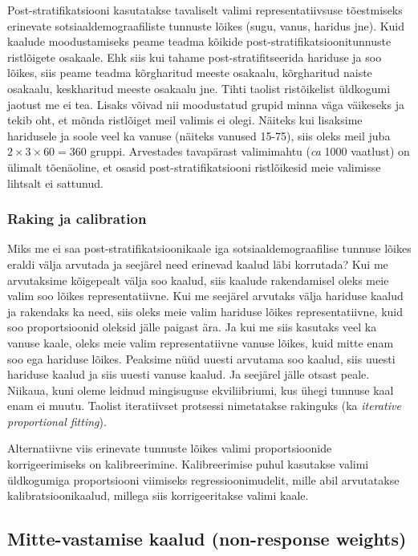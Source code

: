 \documentclass[
]{book}
\begin{document}
Post-stratifikatsiooni kasutatakse tavaliselt valimi representatiivsuse tõestmiseks erinevate sotsiaaldemograafiliste tunnuste lõikes (sugu, vanus, haridus jne). Kuid kaalude moodustamiseks peame teadma kõikide post-stratifikatsioonitunnuste ristlõigete osakaale. Ehk siis kui tahame post-stratifitseerida hariduse ja soo lõikes, siis peame teadma kõrgharitud meeste osakaalu, kõrgharitud naiste osakaalu, keskharitud meeste osakaalu jne. Tihti taolist ristõikelist üldkogumi jaotust me ei tea. Lisaks võivad nii moodustatud grupid minna väga väikeseks ja tekib oht, et mõnda ristlõiget meil valimis ei olegi. Näiteks kui lisaksime haridusele ja soole veel ka vanuse (näiteks vanused 15-75), siis oleks meil juba \(2\times3\times60 = 360\) gruppi. Arvestades tavapärast valimimahtu (\emph{ca} 1000 vaatlust) on ülimalt tõenäoline, et osasid post-stratifikatsiooni ristlõikesid meie valimisse lihtsalt ei sattunud.

\hypertarget{raking-ja-calibration}{%
\subsubsection{Raking ja calibration}\label{raking-ja-calibration}}

Miks me ei saa post-stratifikatsioonikaale iga sotsiaaldemograafilise tunnuse lõikes eraldi välja arvutada ja seejärel need erinevad kaalud läbi korrutada? Kui me arvutaksime kõigepealt välja soo kaalud, siis kaalude rakendamisel oleks meie valim soo lõikes representatiivne. Kui me seejärel arvutaks välja hariduse kaalud ja rakendaks ka need, siis oleks meie valim hariduse lõikes representatiivne, kuid soo proportsioonid oleksid jälle paigast ära. Ja kui me siis kasutaks veel ka vanuse kaale, oleks meie valim representatiivne vanuse lõikes, kuid mitte enam soo ega hariduse lõikes. Peaksime nüüd uuesti arvutama soo kaalud, siis uuesti hariduse kaalud ja siis uuesti vanuse kaalud. Ja seejärel jälle otsast peale. Niikaua, kuni oleme leidnud mingisuguse ekviliibriumi, kus ühegi tunnuse kaal enam ei muutu. Taolist iteratiivset protsessi nimetatakse rakinguks (ka \emph{iterative proportional fitting}).

Alternatiivne viis erinevate tunnuste lõikes valimi proportsioonide korrigeerimiseks on kalibreerimine. Kalibreerimise puhul kasutakse valimi üldkogumiga proportsiooni viimiseks regressioonimudelit, mille abil arvutatakse kalibratsioonikaalud, millega siis korrigeeritakse valimi kaale.

\hypertarget{mitte-vastamise-kaalud-non-response-weights}{%
\subsection{Mitte-vastamise kaalud (non-response weights)}\label{mitte-vastamise-kaalud-non-response-weights}}
\end{document}
